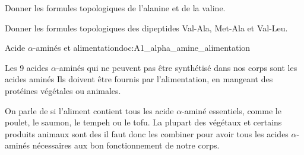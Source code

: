 \numeroQuestion
Donner les formules topologiques de l'alanine et de la valine.
\correction{
  \centering
  \chemfig{!\valine}  \qq{} \chemfig{!\alanine}
}
\pasCorrection{\vspace*{4cm}}

\numeroQuestion
Donner les formules topologiques des dipeptides Val-Ala, Met-Ala et Val-Leu.
\vfill

\begin{doc}{Acide $\alpha$-aminés et alimentation}{doc:A1_alpha_amine_alimentation}
  \begin{importants}
    Les 9 acides $\alpha$-aminés qui ne peuvent pas être synthétisé dans nos corps sont les acides aminés 
    Ils doivent être fournis par l'alimentation, en mangeant des protéines végétales ou animales.
  \end{importants}
  
  On parle de  si l'aliment contient tous les acide $\alpha$-aminé essentiels, comme le poulet, le saumon, le tempeh ou le tofu.
  La plupart des végétaux et certains produits animaux sont des  il faut donc les combiner pour avoir tous les acides $\alpha$-aminés nécessaires aux bon fonctionnement de notre corps.
\end{doc}
